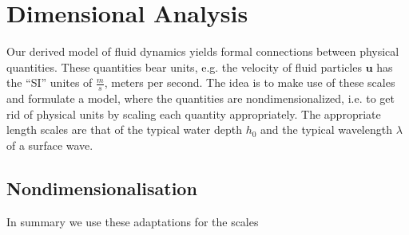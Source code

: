 \section{Dimensional Analysis}
Our derived model of fluid dynamics yields formal connections between
physical quantities. These quantities bear units, e.g. the velocity of fluid
particles $\mathbf{u}$ has the ``SI'' unites of $\frac{m}{s}$, meters per
second. The idea is to make use of these scales and formulate a model, where
the quantities are nondimensionalized, i.e. to get rid of physical units by
scaling each quantity appropriately. The appropriate length scales are that
of the typical water depth $h_0$ and the typical wavelength $\lambda$ of a
surface wave.

\subsection{Nondimensionalisation\label{sec:nondim}}
In summary we use these adaptations for the scales

